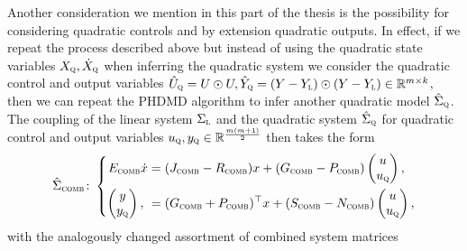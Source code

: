 Another consideration we mention in this part of the thesis is the possibility for considering quadratic controls and by extension quadratic outputs.
In effect, if we repeat the process described above but instead of using the quadratic state variables $X_{\textnormal{\scshape q}}, \dot{X}_{\textnormal{\scshape q}}$ when inferring the quadratic system we consider the quadratic control and output variables $\hat{U}_{\textnormal{\scshape q}} = U \odot U, \hat{Y}_{\textnormal{\scshape q}} = (Y - Y_{\textnormal{\scshape l}}) \odot (Y - Y_{\textnormal{\scshape l}}) \in \mathbb{R}^{m \times k}$, then we can repeat the \ac{PHDMD} algorithm to infer another quadratic model $\hat{\Sigma}_{\textnormal{\scshape q}}$.
The coupling of the linear system $\Sigma_{\textnormal{\scshape l}}$ and the quadratic system $\hat{\Sigma}_{\textnormal{\scshape q}}$ for quadratic control and output variables $u_{\textnormal{\scshape q}}, y_{\textnormal{\scshape q}} \in \mathbb{R}^{\frac{m (m + 1)}{2}}$ then takes the form
\begin{equation}\label{eq:quad-io-system-coupling}
    \hat{\Sigma}_{\textnormal{\scshape comb}} \colon \left\lbrace
    \begin{aligned}
        E_{\textnormal{\scshape comb}} \dot{x} &= (J_{\textnormal{\scshape comb}} - R_{\textnormal{\scshape comb}}) x + (G_{\textnormal{\scshape comb}} - P_{\textnormal{\scshape comb}}) \begin{pmatrix}
            u \\
            u_{\textnormal{\scshape q}}
        \end{pmatrix}, \\
        \begin{pmatrix}
            y \\
            y_{\textnormal{\scshape q}}
        \end{pmatrix}, \ &= (G_{\textnormal{\scshape comb}} + P_{\textnormal{\scshape comb}})^{\top} x + (S_{\textnormal{\scshape comb}} - N_{\textnormal{\scshape comb}}) \begin{pmatrix}
            u \\
            u_{\textnormal{\scshape q}}
        \end{pmatrix},
    \end{aligned}
    \right.
\end{equation}
with the analogously changed assortment of combined system matrices
